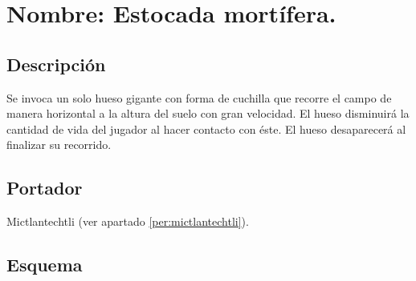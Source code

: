 \section{Nombre: Estocada mortífera.}\label{hab.estMor}
\subsection{Descripción}
Se invoca un solo hueso gigante con forma de cuchilla que recorre el campo de manera horizontal a la altura del suelo con gran velocidad. El hueso disminuirá la cantidad de vida del jugador al hacer contacto con éste. El hueso desaparecerá al finalizar su recorrido.
\subsection{Portador}
Mictlantechtli (ver apartado \ref{per:mictlantechtli}).	
\subsection{Esquema}
						
			